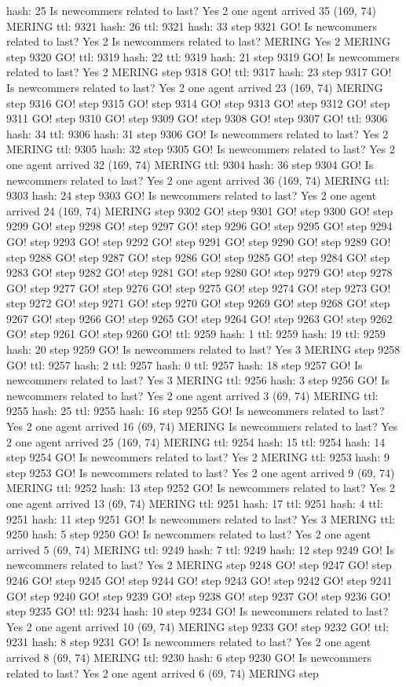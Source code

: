 hash: 25 Is newcommers related to last? Yes 2 one agent arrived 35 (169, 74) MERING ttl: 9321 hash: 26 ttl: 9321 hash: 33 step 9321 GO! Is newcommers related to last? Yes 2 Is newcommers related to last? MERING Yes 2 MERING step 9320 GO! ttl: 9319 hash: 22 ttl: 9319 hash: 21 step 9319 GO! Is newcommers related to last? Yes 2 MERING step 9318 GO! ttl: 9317 hash: 23 step 9317 GO! Is newcommers related to last? Yes 2 one agent arrived 23 (169, 74) MERING step 9316 GO! step 9315 GO! step 9314 GO! step 9313 GO! step 9312 GO! step 9311 GO! step 9310 GO! step 9309 GO! step 9308 GO! step 9307 GO! ttl: 9306 hash: 34 ttl: 9306 hash: 31 step 9306 GO! Is newcommers related to last? Yes 2 MERING ttl: 9305 hash: 32 step 9305 GO! Is newcommers related to last? Yes 2 one agent arrived 32 (169, 74) MERING ttl: 9304 hash: 36 step 9304 GO! Is newcommers related to last? Yes 2 one agent arrived 36 (169, 74) MERING ttl: 9303 hash: 24 step 9303 GO! Is newcommers related to last? Yes 2 one agent arrived 24 (169, 74) MERING step 9302 GO! step 9301 GO! step 9300 GO! step 9299 GO! step 9298 GO! step 9297 GO! step 9296 GO! step 9295 GO! step 9294 GO! step 9293 GO! step 9292 GO! step 9291 GO! step 9290 GO! step 9289 GO! step 9288 GO! step 9287 GO! step 9286 GO! step 9285 GO! step 9284 GO! step 9283 GO! step 9282 GO! step 9281 GO! step 9280 GO! step 9279 GO! step 9278 GO! step 9277 GO! step 9276 GO! step 9275 GO! step 9274 GO! step 9273 GO! step 9272 GO! step 9271 GO! step 9270 GO! step 9269 GO! step 9268 GO! step 9267 GO! step 9266 GO! step 9265 GO! step 9264 GO! step 9263 GO! step 9262 GO! step 9261 GO! step 9260 GO! ttl: 9259 hash: 1 ttl: 9259 hash: 19 ttl: 9259 hash: 20 step 9259 GO! Is newcommers related to last? Yes 3 MERING step 9258 GO! ttl: 9257 hash: 2 ttl: 9257 hash: 0 ttl: 9257 hash: 18 step 9257 GO! Is newcommers related to last? Yes 3 MERING ttl: 9256 hash: 3 step 9256 GO! Is newcommers related to last? Yes 2 one agent arrived 3 (69, 74) MERING ttl: 9255 hash: 25 ttl: 9255 hash: 16 step 9255 GO! Is newcommers related to last? Yes 2 one agent arrived 16 (69, 74) MERING Is newcommers related to last? Yes 2 one agent arrived 25 (169, 74) MERING ttl: 9254 hash: 15 ttl: 9254 hash: 14 step 9254 GO! Is newcommers related to last? Yes 2 MERING ttl: 9253 hash: 9 step 9253 GO! Is newcommers related to last? Yes 2 one agent arrived 9 (69, 74) MERING ttl: 9252 hash: 13 step 9252 GO! Is newcommers related to last? Yes 2 one agent arrived 13 (69, 74) MERING ttl: 9251 hash: 17 ttl: 9251 hash: 4 ttl: 9251 hash: 11 step 9251 GO! Is newcommers related to last? Yes 3 MERING ttl: 9250 hash: 5 step 9250 GO! Is newcommers related to last? Yes 2 one agent arrived 5 (69, 74) MERING ttl: 9249 hash: 7 ttl: 9249 hash: 12 step 9249 GO! Is newcommers related to last? Yes 2 MERING step 9248 GO! step 9247 GO! step 9246 GO! step 9245 GO! step 9244 GO! step 9243 GO! step 9242 GO! step 9241 GO! step 9240 GO! step 9239 GO! step 9238 GO! step 9237 GO! step 9236 GO! step 9235 GO! ttl: 9234 hash: 10 step 9234 GO! Is newcommers related to last? Yes 2 one agent arrived 10 (69, 74) MERING step 9233 GO! step 9232 GO! ttl: 9231 hash: 8 step 9231 GO! Is newcommers related to last? Yes 2 one agent arrived 8 (69, 74) MERING ttl: 9230 hash: 6 step 9230 GO! Is newcommers related to last? Yes 2 one agent arrived 6 (69, 74) MERING step 